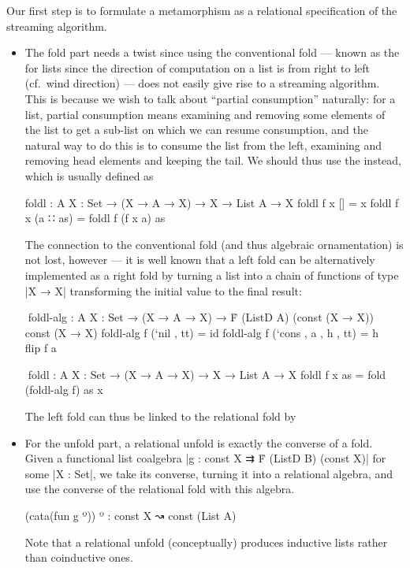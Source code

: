 Our first step is to formulate a metamorphism as a relational specification of the streaming algorithm.
\begin{itemize}
\item The fold part needs a twist since using the conventional fold --- known as the  for lists since the direction of computation on a list is from right to left (cf.~wind direction) --- does not easily give rise to a streaming algorithm.
This is because we wish to talk about ``partial consumption'' naturally: for a list, partial consumption means examining and removing some elements of the list to get a sub-list on which we can resume consumption, and the natural way to do this is to consume the list from the left, examining and removing head elements and keeping the tail.
We should thus use the  instead, which is usually defined as
\begin{code}
foldl : {A X : Set} → (X → A → X) → X → List A → X
foldl f x []        = x
foldl f x (a ∷ as)  = foldl f (f x a) as
\end{code}
The connection to the conventional fold (and thus algebraic ornamentation) is not lost, however --- it is well known that a left fold can be alternatively implemented as a right fold by turning a list into a chain of functions of type |X → X| transforming the initial value to the final result:
\begin{code}
^^^foldl-alg :  {A X : Set} → (X → A → X) →
                Ḟ (ListD A) (const (X → X)) ⇉ const (X → X)
foldl-alg f (`nil   ,          tt) = id
foldl-alg f (`cons  , a , h ,  tt) = h ∘ flip f a

^^^foldl : {A X : Set} → (X → A → X) → X → List A → X
foldl f x as = fold (foldl-alg f) as x
\end{code}
The left fold can thus be linked to the relational fold by
\item For the unfold part, a relational unfold is exactly the converse of a fold.
Given a functional list coalgebra |g : const X ⇉ Ḟ (ListD B) (const X)| for some |X : Set|, we take its converse, turning it into a relational algebra, and use the converse of the relational fold with this algebra.
\begin{code}
(cata(fun g º)) º : const X ↝ const (List A)
\end{code}
Note that a relational unfold (conceptually) produces inductive lists rather than coinductive ones.
\end{itemize}
